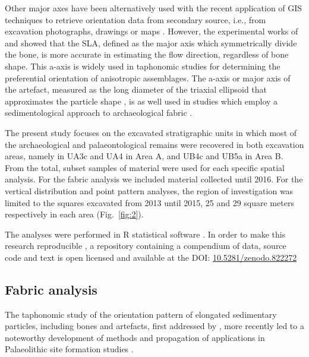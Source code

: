 \documentclass[preprint,authoryear,times]{elsarticle} %
\begin{document}
Other major axes have been alternatively used with the recent application of GIS techniques to retrieve orientation data from secondary source, i.e., from excavation photographs, drawings or maps \citep{Boschian2010,Benito-Calvo2011,Torre2013a,Walter2013,Garcia-Moreno2016,Sanchez-Romero2016}. However, the experimental works of \cite{Dominguez-Rodrigo2013} and \cite{Dominguez-Rodrigo2014} showed that the SLA, defined as the major axis which symmetrically divide the bone, is more accurate in estimating the flow direction, regardless of bone shape. This a-axis is widely used in taphonomic studies \citep[][among others]{Toots1965,Voorhies1969,Eberth2007,Dominguez-Rodrigo2012,Dominguez-Rodrigo2014c,Aramendi2017} for determining the preferential orientation of anisotropic assemblages. The a-axis or major axis of the artefact, measured as the long diameter of the triaxial ellipsoid that approximates the particle shape \citep{Krumbein1941}, is as well used in studies which employ a sedimentological approach to archaeological fabric \citep[][among others]{Bertran1995,Bertran1997,Lenoble2004,Benito-Calvo2009}.

The present study focuses on the excavated stratigraphic units in which most of the archaeological and palaeontological remains were recovered in both excavation areas, namely in UA3c and UA4 in Area A, and UB4c and UB5a in Area B. From the total, subset samples of material were used for each specific spatial analysis. For the fabric analysis we included material collected until 2016. For the vertical distribution and point pattern analyses, the region of investigation was limited to the squares excavated from 2013 until 2015, 25 and 29 square meters respectively in each area (Fig.~\ref{fig:2}).

The analyses were performed in \textsf{R} statistical software \citep{RCoreTeam2017}. In order to make this research reproducible \citep{Marwick2017,Marwick2017a}, a repository containing a compendium of data, source code and text is open licensed and available at the DOI: \href{https://doi.org/10.5281/zenodo.822272}{10.5281/zenodo.822272}

\subsection{Fabric analysis}

The taphonomic study of the orientation pattern of elongated sedimentary particles, including bones and artefacts, first addressed by \cite{Voorhies1969,Isaac1967,Bar-Yosef1972,Schick1986}, more recently led to a noteworthy development of methods and propagation of applications in Palaeolithic site formation studies \citep[][among others]{Bertran1995,Bertran1997,Lenoble2004,Lenoble2008,McPherron2005,Benito-Calvo2009,Benito-Calvo2011a,Benito-Calvo2011,Bernatchez2010,Boschian2010,Dominguez-Rodrigo2012,Dominguez-Rodrigo2013,Dominguez-Rodrigo2014,Torre2013a,Walter2013,Garcia-Moreno2016,Sanchez-Romero2016}.
\end{document}
